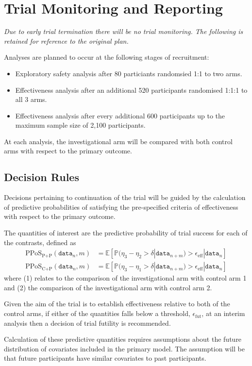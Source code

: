 \documentclass[11pt,parskip=half-]{scrartcl}
\begin{document}
\clearpage

\section{Trial Monitoring and Reporting}

\textit{Due to early trial termination there will be no trial monitoring. The following is retained for reference to the original plan.}

Analyses are planned to occur at the following stages of recruitment:

\begin{itemize}
    \item Exploratory safety analysis after 80 particiants randomsied 1:1 to two arms.
    \item Effectiveness analysis after an additional 520 participants randomised 1:1:1 to all 3 arms.
    \item Effectiveness analysis after every additional 600 participants up to the maximum sample size of 2,100 participants.
\end{itemize}

At each analysis, the investigational arm will be compared with both control arms with respect to the primary outcome.

\subsection{Decision Rules}

Decisions pertaining to continuation of the trial will be guided by the calculation of predictive probabilities of satisfying the pre-specified criteria of effectiveness with respect to the primary outcome.

The quantities of interest are the predictive probability of trial success for each of the contrasts, defined as
\begin{align}
    \text{PPoS}_{\text{P+P}}(\texttt{data}_n, m) & = \mathbb{E}[\mathbb{P}(\eta_3 - \eta_2 > \delta | \texttt{data}_{n+m}) > \epsilon_{\text{eff}} | \texttt{data}_n] \\
    \text{PPoS}_{\text{C+P}}(\texttt{data}_n, m) & = \mathbb{E}[\mathbb{P}(\eta_3 - \eta_1 > \delta | \texttt{data}_{n+m}) > \epsilon_{\text{eff}} | \texttt{data}_n]
\end{align}
where (1) relates to the comparison of the investigational arm with control arm 1 and (2) the comparison of the investigational arm with control arm 2.

Given the aim of the trial is to establish effectiveness relative to both of the control arms, if either of the quantities falls below a threshold, $\epsilon_{\text{fut}}$, at an interim analysis then a decision of trial futility is recommended.

Calculation of these predictive quantities requires assumptions about the future distribution of covariates included in the primary model. The assumption will be that future participants have similar covariates to past participants.

\clearpage

\printbibliography[heading=bibintoc]
\end{document}
